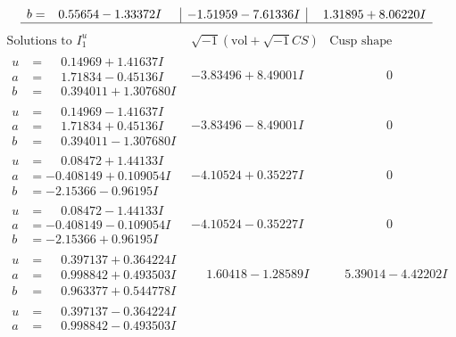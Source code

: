 \documentclass[1p]{elsarticle_modified}
\theoremstyle{definition}
\newcommand{\I}{\sqrt{-1}}
\begin{document}
$$\begin{array}{c|c|c}
\begin{aligned}
b &= \phantom{-}0.55654 - 1.33372 I\end{aligned}
 & -1.51959 - 7.61336 I & \phantom{-}1.31895 + 8.06220 I\\
 \hline 
 \end{array}$$\newpage$$\begin{array}{c|c|c}  
\text{Solutions to }I^u_{1}& \I (\text{vol} + \sqrt{-1}CS) & \text{Cusp shape}\\
 \hline 
\begin{aligned}
u &= \phantom{-}0.14969 + 1.41637 I \\
a &= \phantom{-}1.71834 - 0.45136 I \\
b &= \phantom{-}0.394011 + 1.307680 I\end{aligned}
 & -3.83496 + 8.49001 I & \phantom{-0.000000 } 0 \\ \hline\begin{aligned}
u &= \phantom{-}0.14969 - 1.41637 I \\
a &= \phantom{-}1.71834 + 0.45136 I \\
b &= \phantom{-}0.394011 - 1.307680 I\end{aligned}
 & -3.83496 - 8.49001 I & \phantom{-0.000000 } 0 \\ \hline\begin{aligned}
u &= \phantom{-}0.08472 + 1.44133 I \\
a &= -0.408149 + 0.109054 I \\
b &= -2.15366 - 0.96195 I\end{aligned}
 & -4.10524 + 0.35227 I & \phantom{-0.000000 } 0 \\ \hline\begin{aligned}
u &= \phantom{-}0.08472 - 1.44133 I \\
a &= -0.408149 - 0.109054 I \\
b &= -2.15366 + 0.96195 I\end{aligned}
 & -4.10524 - 0.35227 I & \phantom{-0.000000 } 0 \\ \hline\begin{aligned}
u &= \phantom{-}0.397137 + 0.364224 I \\
a &= \phantom{-}0.998842 + 0.493503 I \\
b &= \phantom{-}0.963377 + 0.544778 I\end{aligned}
 & \phantom{-}1.60418 - 1.28589 I & \phantom{-}5.39014 - 4.42202 I \\ \hline\begin{aligned}
u &= \phantom{-}0.397137 - 0.364224 I \\
a &= \phantom{-}0.998842 - 0.493503 I \\

\end{aligned}
\end{array}$$
\end{document}

